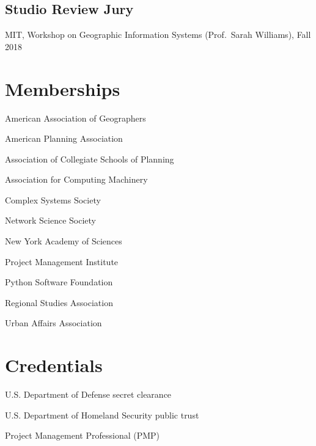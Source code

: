 \documentclass[11pt,letterpaper]{report}
\newcommand{\listitemspace}{0.25em}
\renewenvironment{itemize}
{\begin{list}{}{\setlength{\leftmargin}{0em}
                \setlength{\parskip}{0em}
                \setlength{\itemsep}{\listitemspace}
                \setlength{\parsep}{\listitemspace}}}
{\end{list}}
\begin{document}
    \subsection*{Studio Review Jury}

    \begin{itemize}

        \item MIT, Workshop on Geographic Information Systems (Prof.\ Sarah Williams), Fall 2018

    \end{itemize}



    \section*{Memberships}

    \begin{itemize}

        \item American Association of Geographers
        \item American Planning Association
        \item Association of Collegiate Schools of Planning
        \item Association for Computing Machinery
        \item Complex Systems Society
        \item Network Science Society
        \item New York Academy of Sciences
        \item Project Management Institute
        \item Python Software Foundation
        \item Regional Studies Association
        \item Urban Affairs Association

    \end{itemize}



    \section*{Credentials}

    \begin{itemize}

        \item U.S. Department of Defense secret clearance
        \item U.S. Department of Homeland Security public trust
        \item Project Management Professional (PMP)

    \end{itemize}
\end{document}

